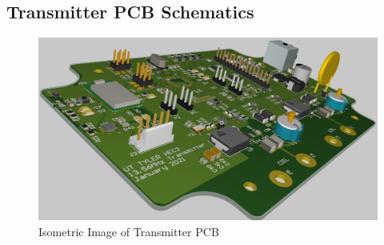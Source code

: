 \documentclass[12pt]{article}
\begin{document}
\begin{appendices}
\pagebreak

\pagebreak


\section{Transmitter PCB Schematics}
\hfill
\begin{figure}[h!]
\centering
\includegraphics[angle=270, width=0.68\linewidth]{trans_pcb_img}
\caption{Isometric Image of Transmitter PCB}
\end{figure}
\hfill
\pagebreak

\pagebreak

\pagebreak

\pagebreak


\end{appendices}
\end{document}
